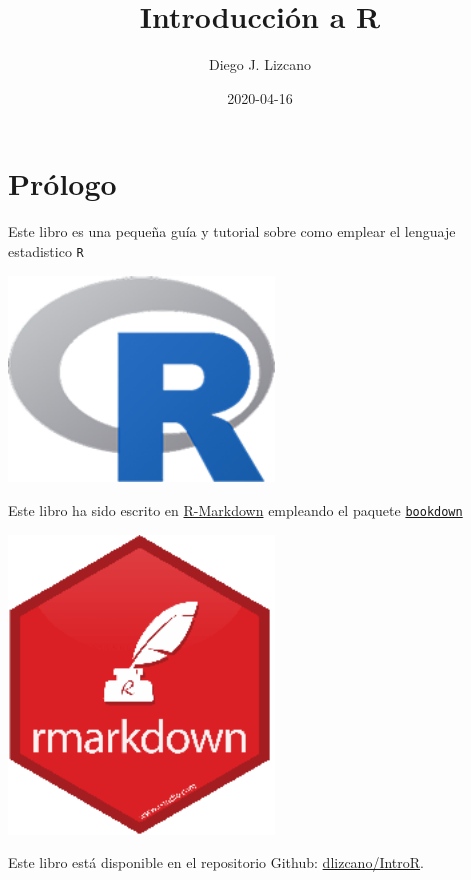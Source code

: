 \documentclass[
]{book}
\title{Introducción a R}
\author{Diego J. Lizcano}
\date{2020-04-16}
\begin{document}
\maketitle

{
\setcounter{tocdepth}{1}
\tableofcontents
}
\hypertarget{pruxf3logo}{%
\chapter*{Prólogo}\label{pruxf3logo}}

Este libro es una pequeña guía y tutorial sobre como emplear el lenguaje estadistico \texttt{R}

\begin{flushleft}\includegraphics[width=2.78in]{images/R} \end{flushleft}

Este libro ha sido escrito en \href{http://rmarkdown.rstudio.com}{R-Markdown} empleando el paquete \href{https://bookdown.org/yihui/bookdown/}{\texttt{bookdown}}

\begin{flushleft}\includegraphics[width=2.78in]{images/rmd} \end{flushleft}

Este libro está disponible en el repositorio Github: \href{https://github.com/dlizcano/IntroR}{dlizcano/IntroR}.
\end{document}
